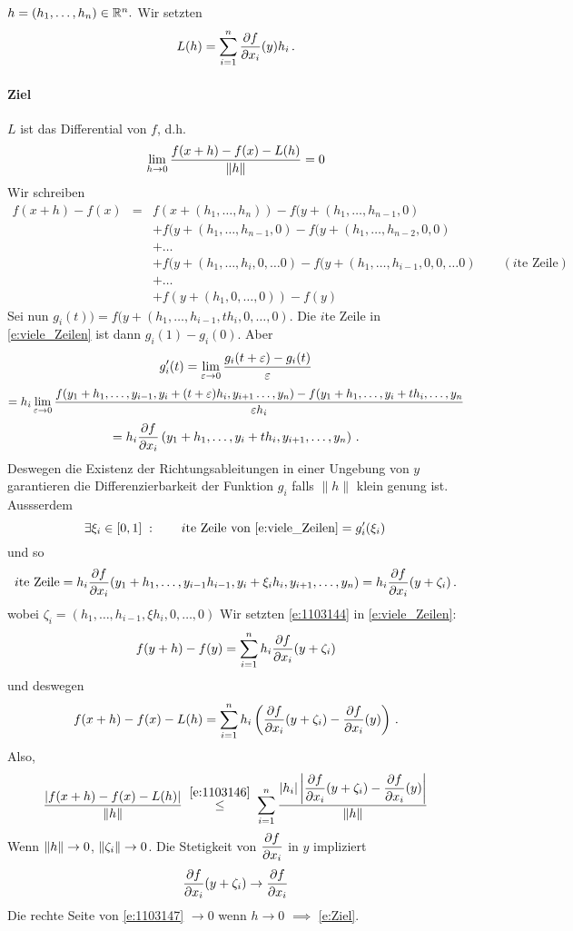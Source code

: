 \begin{Bew}
  $h=(h_1,\dots,h_n)\in\mathbb{R}^n.$ Wir setzten
  \[L(h)=\sum^n_{i=1}\dfrac{\partial f}{\partial x_i}(y)h_i\, .\]
  \paragraph{Ziel} $L$ ist das Differential von $f$, d.h.
\begin{equation}\label{e:Ziel}
\displaystyle\lim_{h\rightarrow0}\frac{f(x+h)-f(x)-L(h)}{\left\| h \right\|}=0
\end{equation}
Wir schreiben
\begin{eqnarray}
f(x+h)-f(x)&=& f(x+(h_1,\dots,h_n))-f(y+(h_1,\dots,h_{n-1},0)\nonumber\\
&&+f(y+(h_1,\dots,h_{n-1}, 0)-f (y + (h_1, \ldots, h_{n-2}, 0, 0)\nonumber\\
&&+\ldots\nonumber\\
&&+ f(y + (h_1, \ldots, h_i, 0, \ldots 0) - f (y + (h_1, \ldots, h_{i-1}, 0, 0, \ldots 0) \qquad(\text{$i$te Zeile})\nonumber\\
&&+\ldots\nonumber\\
&&+f(y+(h_1,0,\dots,0))-f(y)\label{e:viele_Zeilen}
 \end{eqnarray}
Sei nun $g_i (t))=f(y+(h_1,\dots,h_{i-1},th_i,0,\dots,0)$. Die
$i$te Zeile in \eqref{e:viele_Zeilen} ist dann $g_i(1)-g_i(0)$. Aber 
  \[g_i'(t)=\displaystyle\lim_{\varepsilon\rightarrow0}\frac{g_i(t+\varepsilon)-g_i(t)}{\varepsilon}\]
  \[=h_i\displaystyle\lim_{\varepsilon\rightarrow0}\frac{f(y_1+h_1,\dots,y_{i-1},y_i+(t+\varepsilon)h_i,y_{i+1}\dots,y_n)-f(y_1+h_1,\dots,y_i+th_i,\dots,y_n}{\varepsilon h_i}\]
  \[=h_i\dfrac{\partial f}{\partial x_i}\left( y_1+h_1,\dots,y_i+th_i,y_{i+1},\dots,y_n \right)\, .\]
Deswegen die Existenz
der Richtungsableitungen in einer Ungebung von $y$ garantieren die Differenzierbarkeit
der Funktion $g_i$ falls $\|h\|$ klein genung ist. Aussserdem
\[
 \exists \xi_i\in \left[ 0,1 \right] \;: \qquad \text{$i$te Zeile von \eqref{e:viele_Zeilen}} =g_i'(\xi_i)\, 
\]
und so
 \begin{equation}
    \label{e:1103144}
\text{$i$te Zeile}=h_i\dfrac{\partial f}{\partial x_i}(y_1+h_1,\dots,y_{i-1}h_{i-1},y_i+\xi_ih_i,y_{i+1},\dots,y_n)
    =h_i\dfrac{\partial f}{\partial x_i}(y+\zeta_i)\, .
\end{equation}
wobei $\zeta_i=\left( h_1,\dots,h_{i-1},\xi h_i,0,\dots,0 \right)$
Wir setzten \eqref{e:1103144} in \eqref{e:viele_Zeilen}:
\[
f(y+h)-f(y)=\sum_{i=1}^nh_i\dfrac{\partial f}{\partial x_i}(y+\zeta_i)
\]
und deswegen
\begin{equation}
    \label{e:1103146}
f(x+h)-f(x)-L(h) = \sum_{i=1}^nh_i\left( \dfrac{\partial f}{\partial x_i}(y+\zeta_i)-\dfrac{\partial f}{\partial x_i}(y) \right)\, .
\end{equation}
Also,
\begin{equation}\label{e:1103147}
\frac{\left| f(x+h)-f(x)-L(h) \right|}{\left\| h \right\|}
  \;\stackrel{\eqref{e:1103146}}{\leq}\;\sum_{i=1}^n\frac{\left| h_i \right|\left| \dfrac{\partial f}{\partial x_i}(y+\zeta_i)-\dfrac{\partial f}{\partial x_i}(y) \right|}{\left\| h \right\|}
  \end{equation}
  Wenn $\left\| h \right\|\rightarrow 0$, $\left\| \zeta_i \right\|\rightarrow 0$. Die Stetigkeit von $\dfrac{\partial f}{\partial x_i}$ in $y$ impliziert
  \[\dfrac{\partial f}{\partial x_i}(y+\zeta_i)\rightarrow\dfrac{\partial f}{\partial x_i}\]
  Die rechte Seite von \eqref{e:1103147} $\to 0$ wenn $h\to 0$ $\implies$ \eqref{e:Ziel}.
\end{Bew}

